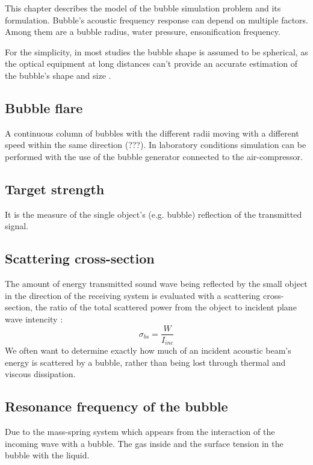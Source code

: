 This chapter describes the model of the bubble simulation problem and its formulation.  
Bubble's acoustic frequency response can depend on multiple factors. Among them are a bubble radius, water pressure, ensonification frequency.

For the simplicity, in most studies the bubble shape is assumed to be spherical, as the optical equipment at long distances can't provide an accurate estimation of the bubble's shape and size \cite[p.2]{zhang_efficient_2022}. 

\subsection{Bubble flare} 
A continuous column of bubbles with the different radii moving with a different speed within the same direction (???). In laboratory conditions simulation can be performed with the use of the bubble generator connected to the air-compressor. 

\subsection{Target strength} 
It is the measure of the single object's (e.g. bubble) reflection of the transmitted signal. %

\subsection{Scattering cross-section} 

The amount of energy transmitted sound wave being reflected by the small object in the direction of the receiving system is evaluated with a scattering cross-section, the ratio of the total scattered power from the object to incident plane wave intencity \cite[p. 40]{hodges_underwater_2011}:
\begin{equation}
    \sigma_{bs}=\frac{W}{I_{inc}}
\end{equation}
We often want to determine exactly how much of an incident acoustic beam's energy is scattered by a bubble, rather than being lost through thermal and viscous dissipation.


\subsection{Resonance frequency of the bubble}
Due to the mass-spring system which appears from the interaction of the incoming wave with a bubble. The gas inside and the surface tension in the bubble with the liquid. 

